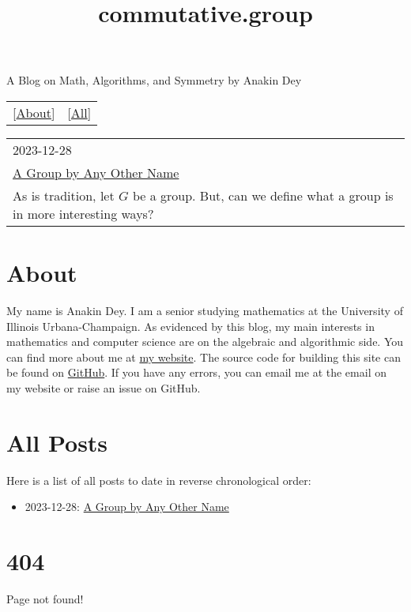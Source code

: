 \documentclass{article}
\title{commutative.group}
\begin{document}
\maketitle
\newline
\begin{center}
  A Blog on Math, Algorithms, and Symmetry by Anakin Dey
\end{center}
\begin{table}
  \centering
  \begin{tabular}{cc}
    \LARGE[\href{About.html}{About}] & \LARGE[\href{All-Posts.html}{All}]
  \end{tabular}
\end{table}

\begin{table}
  \centering
  \begin{tabular}{|l|}
    \hline
    \large 2023-12-28 \\
    \LARGE \href{posts/other_name.html}{A Group by Any Other Name} \\
    As is tradition, let $G$ be a group. But, can we define what a group is in more interesting ways? \\
    \hline
  \end{tabular}
\end{table}

\part*{\centering About}

\newline

My name is Anakin Dey.
I am a senior studying mathematics at the University of Illinois Urbana-Champaign.
As evidenced by this blog, my main interests in mathematics and computer science are on the algebraic and algorithmic side.
You can find more about me at \href{https://www.anakin-dey.com/}{my website}.
The source code for building this site can be found on \href{https://github.com/Spamakin/abel}{GitHub}.
If you have any errors, you can email me at the email on my website or raise an issue on GitHub.

\part*{\centering All Posts}

\newline

Here is a list of all posts to date in reverse chronological order:

\begin{itemize}
\item 2023-12-28: \href{posts/other_name.html}{A Group by Any Other Name}
\end{itemize}

\part*{404}

\newline

Page not found!
\end{document}
